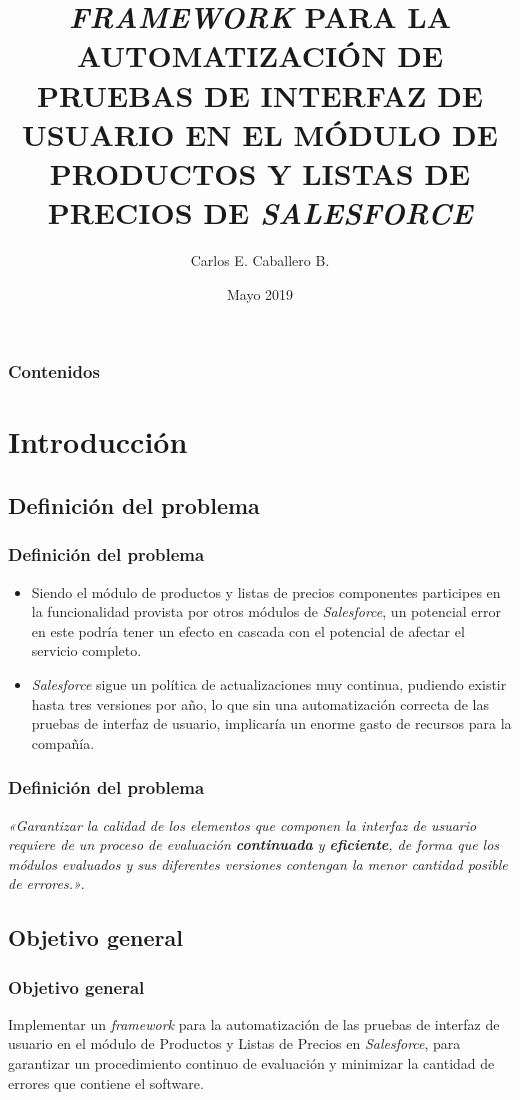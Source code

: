 \documentclass{beamer}
\title{\textbf{\emph{FRAMEWORK} PARA LA AUTOMATIZACIÓN DE PRUEBAS DE INTERFAZ DE
USUARIO EN EL MÓDULO DE PRODUCTOS Y LISTAS DE PRECIOS DE \emph{SALESFORCE}}}
\author{\small{Carlos E. Caballero B.}}
\date{\tiny{Mayo 2019}}
\begin{document}
\begin{frame}
\titlepage
\end{frame}

\begin{frame}
\frametitle{Contenidos}
\tableofcontents
\end{frame}

\section{Introducción}

\subsection{Definición del problema}

\begin{frame}
\frametitle{Definición del problema}
\begin{itemize}
\item \small{Siendo el módulo de productos y listas de precios componentes
participes en la funcionalidad provista por otros módulos de \emph{Salesforce},
un potencial error en este podría tener un efecto en cascada con el potencial de
afectar el servicio completo.}
\item \small{\emph{Salesforce} sigue un política de actualizaciones muy continua,
pudiendo existir hasta tres versiones por año, lo que sin una automatización
correcta de las pruebas de interfaz de usuario, implicaría un enorme gasto de
recursos para la compañía.}
\end{itemize}
\end{frame}

\begin{frame}
\frametitle{Definición del problema}
\emph{«Garantizar la calidad de los elementos que componen la interfaz de
usuario requiere de un proceso de evaluación \textbf{continuada} y
\textbf{eficiente}, de forma que los módulos evaluados y sus diferentes
versiones contengan la menor cantidad posible de errores.»}.
\end{frame}

\subsection{Objetivo general}

\begin{frame}
\frametitle{Objetivo general}
Implementar un \emph{framework} para la automatización de las pruebas de
interfaz de usuario en el módulo de Productos y Listas de Precios en
\emph{Salesforce}, para garantizar un procedimiento continuo de evaluación y
minimizar la cantidad de errores que contiene el software.
\end{frame}
\end{document}
